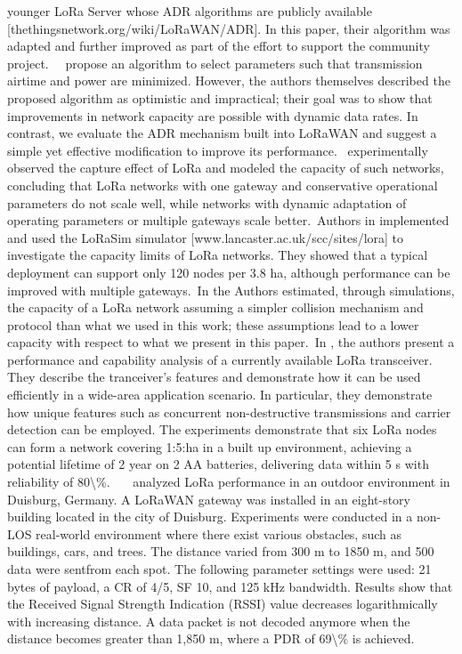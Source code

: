 younger LoRa Server whose ADR algorithms are publicly available [thethingsnetwork.org/wiki/LoRaWAN/ADR]. In this paper, their algorithm was adapted and further improved as part of the effort to support the community project.~~\citet{bor_lora_2016} propose an algorithm to select parameters such that transmission airtime and power are minimized. However, the authors themselves described the proposed algorithm as optimistic and impractical; their goal was to show that improvements in network capacity are possible with dynamic data rates. In contrast, we evaluate the ADR mechanism built into LoRaWAN and suggest a simple yet effective modification to improve its performance.~\citet{bor_lora_2016} experimentally observed the capture effect of LoRa and modeled the capacity of such networks, concluding that LoRa networks with one gateway and conservative operational parameters do not scale well, while networks with dynamic adaptation of operating parameters or multiple gateways scale better.~Authors in \cite{bor_lora_2016} implemented and used the LoRaSim simulator [www.lancaster.ac.uk/scc/sites/lora] to investigate the capacity limits of LoRa networks. They showed that a typical deployment can support only 120 nodes per 3.8 ha, although performance can be improved with multiple gateways.~In \cite{bor_lora_2016} the Authors estimated, through simulations, the capacity of a LoRa network assuming a simpler collision mechanism and protocol than what we used in this work; these assumptions lead to a lower capacity with respect to what we present in this paper.~In \cite{bor_lora_nodate}, the authors present a performance and capability analysis of a currently available LoRa transceiver. They describe the tranceiver's features and demonstrate how it can be used efficiently in a wide-area application scenario. In particular, they demonstrate how unique features such as concurrent non-destructive transmissions and carrier detection can be employed. The experiments demonstrate that six LoRa nodes can form a network covering 1:5:ha in a built up environment, achieving a potential lifetime of 2 year on 2 AA batteries, delivering data within 5 s with reliability of 80\textbackslash\%.~~~   \newline 
 \cite{erbati_analysis_2018}   \citet{erbati_analysis_2018} analyzed LoRa performance in an outdoor environment in Duisburg, Germany. A LoRaWAN gateway was installed in an eight-story building located in the city of Duisburg. Experiments were conducted in a non-LOS real-world environment where there exist various obstacles, such as buildings, cars, and trees. The distance varied from 300 m to 1850 m, and 500 data were sentfrom each spot. The following parameter settings were used: 21 bytes of payload, a CR of 4/5, SF 10, and 125 kHz bandwidth. Results show that the Received Signal Strength Indication (RSSI) value decreases logarithmically with increasing distance. A data packet is not decoded anymore when the distance becomes greater than 1,850 m, where a PDR of 69\textbackslash\% is achieved.~   \newline 
